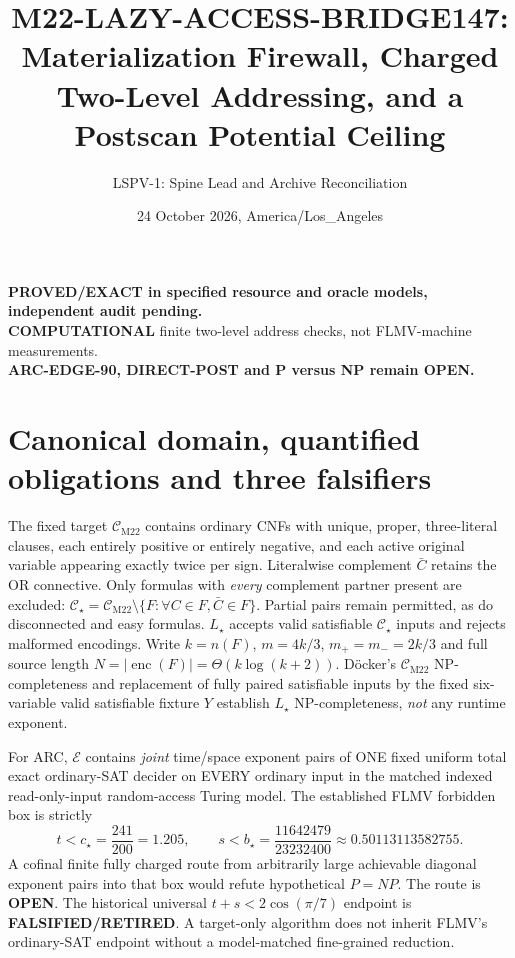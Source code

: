 \documentclass[11pt]{article}
\title{M22-LAZY-ACCESS-BRIDGE147: Materialization Firewall, Charged Two-Level Addressing, and a Postscan Potential Ceiling}
\author{LSPV-1: Spine Lead and Archive Reconciliation}
\date{24 October 2026, America/Los\_Angeles}
\newcommand{\CS}{\mathcal C_\star}
\newcommand{\CM}{\mathcal C_{\mathrm{M22}}}
\begin{document}
\maketitle
\begin{center}
\textbf{PROVED/EXACT in specified resource and oracle models, independent audit pending.}\\
\textbf{COMPUTATIONAL} finite two-level address checks, not FLMV-machine measurements.\\
\textbf{ARC-EDGE-90, DIRECT-POST and P versus NP remain OPEN.}
\end{center}

\section{Canonical domain, quantified obligations and three falsifiers}
The fixed target $\CM$ contains ordinary CNFs with unique, proper,
three-literal clauses, each entirely positive or entirely negative, and each
active original variable appearing exactly twice per sign. Literalwise
complement $\bar C$ retains the OR connective. Only formulas with
\emph{every} complement partner present are excluded:
$\CS=\CM\setminus\{F:\forall C\in F,\bar C\in F\}$. Partial pairs remain
permitted, as do disconnected and easy formulas. $L_\star$ accepts valid
satisfiable $\CS$ inputs and rejects malformed encodings. Write
$k=n(F)$, $m=4k/3$, $m_+=m_-=2k/3$ and full source length
$N=|\operatorname{enc}(F)|=\Theta(k\log(k+2))$.
D\"ocker's $\CM$ NP-completeness and replacement of fully paired
satisfiable inputs by the fixed six-variable valid satisfiable fixture
$Y$ establish $L_\star$ NP-completeness, \emph{not} any runtime exponent.

For ARC, $\mathcal E$ contains \emph{joint} time/space exponent pairs of
ONE fixed uniform total exact ordinary-SAT decider on EVERY ordinary
input in the matched indexed read-only-input random-access Turing model.
The established FLMV forbidden box is strictly
\[
 t<c_\star=\frac{241}{200}=1.205,\qquad
 s<b_\star=\frac{11642479}{23232400}\approx0.50113113582755.
\]
A cofinal finite fully charged route from arbitrarily large achievable
diagonal exponent pairs into that box would refute hypothetical $P=NP$.
The route is \textbf{OPEN}. The historical universal
$t+s<2\cos(\pi/7)$ endpoint is \textbf{FALSIFIED/RETIRED}.
A target-only algorithm does not inherit FLMV's ordinary-SAT endpoint
without a model-matched fine-grained reduction.
\end{document}
